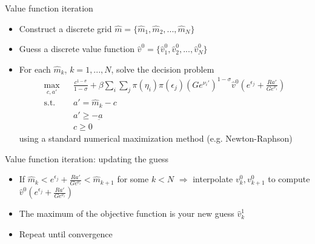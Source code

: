 \documentclass[9pt]{beamer}
\newcommand{\bit}{\begin{itemize}}
\newcommand{\eit}{\end{itemize}}
\newcommand{\bc}{\color{blue}}
\begin{document}
\begin{frame}{Value function iteration}

\bit
\setlength\itemsep{1em}
\item Construct a discrete grid $\hat m = \{\hat m_1, \hat m_2, ..., \hat m_N\}$

\item Guess a discrete value function $\hat v^{0} = \{\hat v^{0}_1, \hat v^{0}_2, ..., \hat v^{0}_N\}$

\item For each $\hat m_k$, $k=1,...,N$, solve the decision problem
\begin{eqnarray}
\max_{c, a'} && \frac{c^{1-\sigma}}{1-\sigma} + \beta \sum_{i} \sum_{j} \pi(\eta_i) \pi(\epsilon_j) \left(Ge^{\nu_i'}\right)^{1-\sigma} \hat v^0\left(e^{\epsilon_j} + \frac{R a'}{Ge^{\nu_i}}\right) \nonumber \\
\text{s.t. } && a' = \hat m_k - c \nonumber \\
&& a' \geq -\underbar a \nonumber \\
&& c \geq 0 \nonumber
\end{eqnarray}
using a standard numerical maximization method (e.g. Newton-Raphson)

\eit

\end{frame}

\begin{frame}{Value function iteration: updating the guess}

\bit
\setlength\itemsep{1em}

\item If $\hat m_k<e^{\epsilon_j} + \frac{R a'}{Ge^{\nu_i}}<\hat m_{k+1}$ for some $k<N$ $\Rightarrow$ interpolate $v^0_k, v^0_{k+1}$ to compute $\hat v^0\left(e^{\epsilon_j} + \frac{R a'}{Ge^{\nu_i}}\right)$

\item The maximum of the objective function is your new guess $\hat v^1_k$

\item Repeat until convergence
\eit

%

\end{frame}

%
%
%
\end{document}
